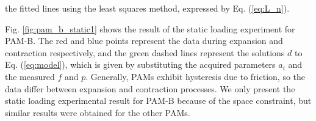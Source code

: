 \noindent the fitted lines using the least squares method, expressed by Eq. (\ref{eq:L_n}).

Fig. \ref{fig:pam_b_static1} shows the result of the static loading experiment for PAM-B. The red and blue points represent the data during expansion and contraction respectively, and the green dashed lines represent the solutions $d$ to Eq. (\ref{eq:model}), which is given by substituting the acquired parameters $a_i$ and the measured $f$ and $p$.
Generally, PAMs exhibit hysteresis due to friction, so the data differ between expansion and contraction processes. We only present the static loading experimental result for PAM-B because of the space constraint, but similar results were obtained for the other PAMs.










